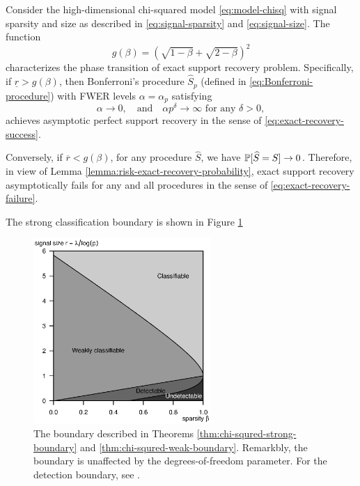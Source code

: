 \begin{theorem} \label{thm:chi-squred-strong-boundary}
Consider the high-dimensional chi-squared model \eqref{eq:model-chisq} with signal sparsity and size as described in \eqref{eq:signal-sparsity} and \eqref{eq:signal-size}.
The function 
\begin{equation} \label{eq:strong-classification-boundary-chisquared}
    g(\beta) = \left(\sqrt{1-\beta} + \sqrt{2-\beta}\right)^2
\end{equation}
characterizes the phase transition of exact support recovery problem.
Specifically, if $\underline{r} > {{g}}(\beta)$, then Bonferroni's procedure $\widehat{S}_p$ (defined in \eqref{eq:Bonferroni-procedure}) with FWER levels $\alpha=\alpha_p$ satisfying
\begin{equation} \label{eq:FWER-rate-to-zero}
    \alpha\to 0,\quad \text{and} \quad \alpha p^\delta\to\infty \text{  for any } \delta>0,
\end{equation}
achieves asymptotic perfect support recovery in the sense of \eqref{eq:exact-recovery-success}. 

Conversely, if $\overline{r} < {{g}}(\beta)$, for any procedure $\widehat{S}$, we have $\P[\widehat{S}=S]\to0$.
Therefore, in view of Lemma \ref{lemma:risk-exact-recovery-probability}, exact support recovery asymptotically fails for any and all procedures in the sense of \eqref{eq:exact-recovery-failure}.
\end{theorem}

The strong classification boundary is shown in Figure \ref{fig:phase-chi-squared}

\begin{figure}
      \centering
      \includegraphics[width=0.6\textwidth]{./phase_diagram_chisquared.eps}
      \caption{The boundary described in Theorems \ref{thm:chi-squred-strong-boundary} and \ref{thm:chi-squred-weak-boundary}. 
      Remarkbly, the boundary is unaffected by the degrees-of-freedom parameter.
      For the detection boundary, see \citep{donoho2004higher}.} 
      \label{fig:phase-chi-squared}
\end{figure}

